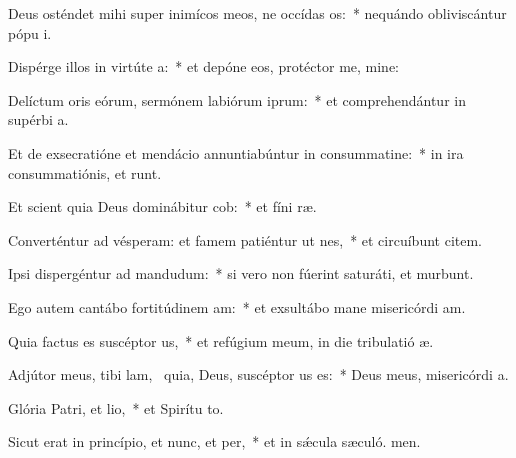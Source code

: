 \item Deus osténdet mihi super inimícos meos, ne occídas os:~* nequándo obliviscántur pópu i.
\item Dispérge illos in virtúte a:~* et depóne eos, protéctor me, mine:
\item Delíctum oris eórum, sermónem labiórum iprum:~* et comprehendántur in supérbi a.
\item Et de exsecratióne et mendácio annuntiabúntur in consummatine:~* in ira consummatiónis, et  runt.
\item Et scient quia Deus dominábitur cob:~* et fíni ræ.
\item Converténtur ad vésperam: et famem patiéntur ut nes,~* et circuíbunt citem.
\item Ipsi dispergéntur ad mandudum:~* si vero non fúerint saturáti, et murbunt.
\item Ego autem cantábo fortitúdinem am:~* et exsultábo mane misericórdi am.
\item Quia factus es suscéptor us,~* et refúgium meum, in die tribulatió æ.
\item Adjútor meus, tibi lam,~\pscross{} quia, Deus, suscéptor us es:~* Deus meus, misericórdi a.
\item Glória Patri, et lio,~* et Spirítu to.
\item Sicut erat in princípio, et nunc, et per,~* et in sǽcula sæculó. men.

